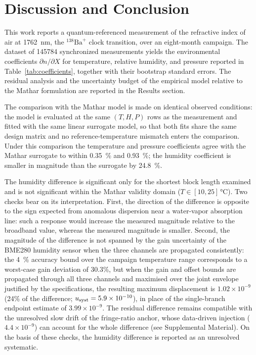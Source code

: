 \documentclass[aps,prapplied,reprint,groupedaddress,twocolumn,superscriptaddress,linenumbers]{revtex4-2}
\begin{document}
\section{Discussion and Conclusion}
\label{sec:discussion}

This work reports a quantum-referenced measurement of the refractive index of air at \SI{1762}{\nano\meter}, the $^{138}\mathrm{Ba}^+$ clock transition, over an eight-month campaign. The dataset of \num{145784} synchronized measurements yields the environmental coefficients $\partial n/\partial X$ for temperature, relative humidity, and pressure reported in Table~\ref{tab:coefficients}, together with their bootstrap standard errors. The residual analysis and the uncertainty budget of the empirical model relative to the Mathar formulation are reported in the Results section.

The comparison with the Mathar model is made on identical observed conditions: the model is evaluated at the same $(T,H,P)$ rows as the measurement and fitted with the same linear surrogate model, so that both fits share the same design matrix and no reference-temperature mismatch enters the comparison. Under this comparison the temperature and pressure coefficients agree with the Mathar surrogate to within \SI{0.35}{\percent} and \SI{0.93}{\percent}; the humidity coefficient is smaller in magnitude than the surrogate by \SI{24.8}{\percent}.

The humidity difference is significant only for the shortest block length examined and is not significant within the Mathar validity domain ($T \in [10,25]\,\si{\degreeCelsius}$). Two checks bear on its interpretation. First, the direction of the difference is opposite to the sign expected from anomalous dispersion near a water-vapor absorption line: such a response would increase the measured magnitude relative to the broadband value, whereas the measured magnitude is smaller. Second, the magnitude of the difference is not spanned by the gain uncertainty of the BME280 humidity sensor when the three channels are propagated consistently: the \SI{4}{\percent} accuracy bound over the campaign temperature range corresponds to a worst-case gain deviation of 30.3\%, but when the gain and offset bounds are propagated through all three channels and maximised over the joint envelope justified by the specifications, the resulting maximum displacement is $1.02 \times 10^{-9}$ (24\% of the difference; $u_{\rm syst} = 5.9 \times 10^{-10}$), in place of the single-branch endpoint estimate of $3.99 \times 10^{-9}$. The residual difference remains compatible with the unresolved slow drift of the fringe-ratio anchor, whose data-driven injection ($4.4 \times 10^{-9}$) can account for the whole difference (see Supplemental Material). On the basis of these checks, the humidity difference is reported as an unresolved systematic.
\end{document}
